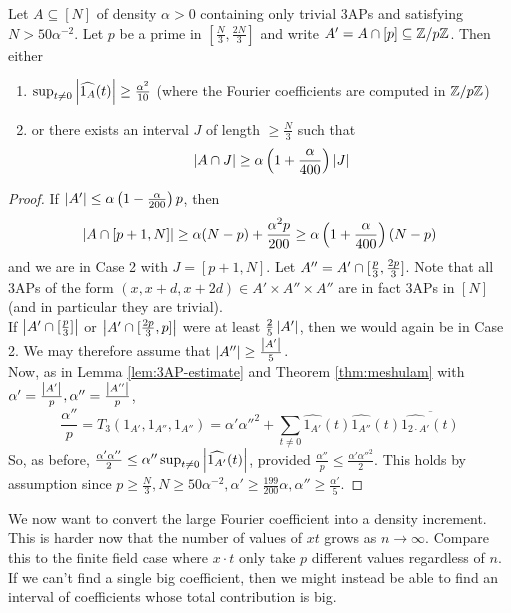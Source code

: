 \documentclass{article}
\begin{document}
\begin{nlemma}
  Let $A \subseteq [N]$ of density $\alpha > 0$ containing only trivial 3APs and satisfying $N > 50\alpha^{-2}$. Let $p$ be a prime in $[\frac N3, \frac{2N}3]$ and write $A' = A \cap [p] \subseteq \mathbb Z/p\mathbb Z$. Then either
  \begin{enumerate}
    \item $\sup_{t \ne 0} \left\lvert \widehat{1_A}(t)\right\rvert \ge \frac{\alpha^2}{10}$ (where the Fourier coefficients are computed in $\mathbb Z/p\mathbb Z$)
    \item or there exists an interval $J$ of length $\ge \frac N3$ such that
    $$\left\lvert A \cap J\right\rvert \ge \alpha\left(1 + \frac\alpha{400}\right)\left\lvert J\right\rvert$$
  \end{enumerate}
\end{nlemma}
\begin{proof}
  If $\left\lvert A'\right\rvert \le \alpha\left(1 - \frac\alpha{200}\right)p$, then
  $$\left\lvert A \cap [p + 1, N]\right\rvert \ge \alpha(N - p) + \frac{\alpha^2p}{200} \ge \alpha\left(1 + \frac\alpha{400}\right)(N - p)$$
  and we are in Case 2 with $J = [p + 1, N]$. Let $A'' = A' \cap [\frac p3, \frac{2p}3]$. Note that all 3APs of the form $(x, x + d, x + 2d) \in A' \times A'' \times A''$ are in fact 3APs in $[N]$ (and in particular they are trivial). \\
  If $\left\lvert A' \cap [\frac p3]\right\rvert$ or $\left\lvert A' \cap [\frac{2p}3, p]\right\rvert$ were at least $\frac 25\left\lvert A'\right\rvert$, then we would again be in Case 2. We may therefore assume that $\left\lvert A''\right\rvert \ge \frac{\left\lvert A'\right\rvert}5$. \\
  Now, as in Lemma \ref{lem:3AP-estimate} and Theorem \ref{thm:meshulam} with $\alpha' = \frac{\left\lvert A'\right\rvert}p, \alpha'' = \frac{\left\lvert A''\right\rvert}p$,
  $$\frac{\alpha''}p = T_3(1_{A'}, 1_{A''}, 1_{A''}) = \alpha'\alpha''^2 + \sum_{t \ne 0}\widehat{1_{A'}}(t)\widehat{1_{A''}}(t)\overline{\widehat{1_{2 \cdot A'}}(t)}$$
  So, as before, $\frac{\alpha'\alpha''}2 \le \alpha''\sup_{t \ne 0} \left\lvert \widehat{1_{A'}}(t)\right\rvert$, provided $\frac{\alpha''}p \le \frac{\alpha'\alpha''^2}2$. This holds by assumption since $p \ge \frac N3, N \ge 50\alpha^{-2}, \alpha' \ge \frac{199}{200}\alpha, \alpha'' \ge \frac{\alpha'}5$.
\end{proof}

\newlec

We now want to convert the large Fourier coefficient into a density increment. This is harder now that the number of values of $xt$ grows as $n \to \infty$. Compare this to the finite field case where $x \cdot t$ only take $p$ different values regardless of $n$. If we can't find a single big coefficient, then we might instead be able to find an interval of coefficients whose total contribution is big.
\end{document}
